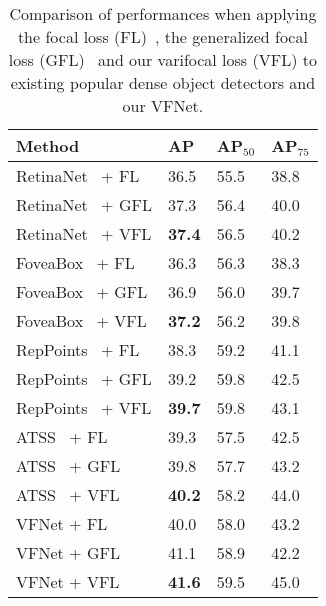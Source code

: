 \begin{table}[t]
    \begin{center}
        \begin{tabular}{ K{12em}  | K{3em} K{3em} K{3em} }
            \hline
             Method  & AP &  AP$_{50}$ &  AP$_{75}$ \\
            \hline
             RetinaNet~\cite{retinaNet} + FL  & 36.5 & 55.5 & 38.8  \\ 
             RetinaNet~\cite{retinaNet} + GFL & 37.3 & 56.4 & 40.0  \\ 
             RetinaNet~\cite{retinaNet} + VFL & \textbf{37.4} & 56.5 & 40.2  \\ 
             \hline
             FoveaBox~\cite{foveaBox} + FL  & 36.3 & 56.3 & 38.3  \\ 
             FoveaBox~\cite{foveaBox} + GFL & 36.9 & 56.0 & 39.7  \\ 
             FoveaBox~\cite{foveaBox} + VFL & \textbf{37.2} & 56.2 & 39.8  \\
             \hline
             RepPoints~\cite{repPoints} + FL  & 38.3 & 59.2 & 41.1  \\ 
             RepPoints~\cite{repPoints} + GFL & 39.2 & 59.8 & 42.5 \\ 
             RepPoints~\cite{repPoints} + VFL & \textbf{39.7} & 59.8 & 43.1  \\ 
             \hline
             ATSS~\cite{ATSS} + FL & 39.3 & 57.5 & 42.5 \\
             ATSS~\cite{ATSS} + GFL & 39.8 & 57.7 & 43.2 \\
             ATSS~\cite{ATSS} + VFL & \textbf{40.2} & 58.2 & 44.0 \\
             \hline
             VFNet + FL  & 40.0 & 58.0 & 43.2 \\ 
             VFNet + GFL & 41.1 & 58.9 & 42.2 \\ 
             VFNet + VFL & \textbf{41.6} & 59.5 & 45.0 \\ 
            \hline
        \end{tabular}
    \end{center}
    \vspace{-5mm}
\caption{Comparison of performances when applying the focal loss (FL)~\cite{retinaNet}, the generalized focal loss (GFL)~\cite{GFL} and our varifocal loss (VFL) to existing popular dense object detectors and our VFNet.}
\label{table:existing}
\vspace{-4mm}
\end{table}

